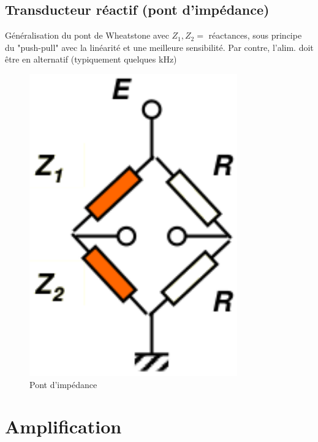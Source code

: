 \subsection{Transducteur réactif (pont d'impédance)}
\begin{minipage}[t]{0.8\textwidth}
	Généralisation du pont de Wheatstone avec \(Z_1, Z_2=\) réactances, sous principe du "push-pull" avec la linéarité et une meilleure sensibilité. Par contre, l'alim. doit être en alternatif (typiquement quelques \si{\kilo\hertz})
\end{minipage}\begin{minipage}[t]{0.2\textwidth}
\begin{figure}[H] 
	\centering 
	\vspace{-2.1cm}
	\includegraphics[width=0.8\textwidth,height=7\baselineskip,keepaspectratio]{ch4/image11} 
	\caption{Pont d'impédance} 
\end{figure}
\end{minipage}
\section{Amplification}
